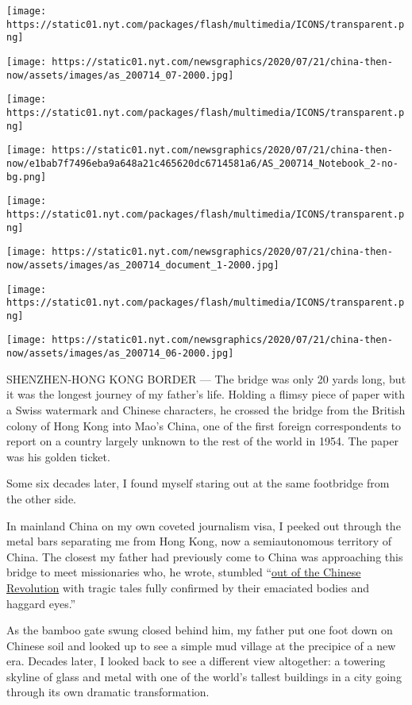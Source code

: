 \texttt{[image: https://static01.nyt.com/packages/flash/multimedia/ICONS/transparent.png]}

\texttt{[image: https://static01.nyt.com/newsgraphics/2020/07/21/china-then-now/assets/images/as\_200714\_07-2000.jpg]}

\texttt{[image: https://static01.nyt.com/packages/flash/multimedia/ICONS/transparent.png]}

\texttt{[image: https://static01.nyt.com/newsgraphics/2020/07/21/china-then-now/e1bab7f7496eba9a648a21c465620dc6714581a6/AS\_200714\_Notebook\_2-no-bg.png]}

\texttt{[image: https://static01.nyt.com/packages/flash/multimedia/ICONS/transparent.png]}

\texttt{[image: https://static01.nyt.com/newsgraphics/2020/07/21/china-then-now/assets/images/as\_200714\_document\_1-2000.jpg]}

\texttt{[image: https://static01.nyt.com/packages/flash/multimedia/ICONS/transparent.png]}

\texttt{[image: https://static01.nyt.com/newsgraphics/2020/07/21/china-then-now/assets/images/as\_200714\_06-2000.jpg]}

SHENZHEN-HONG KONG BORDER --- The bridge was only 20 yards long, but it
was the longest journey of my father's life. Holding a flimsy piece of
paper with a Swiss watermark and Chinese characters, he crossed the
bridge from the British colony of Hong Kong into Mao's China, one of the
first foreign correspondents to report on a country largely unknown to
the rest of the world in 1954. The paper was his golden ticket.

Some six decades later, I found myself staring out at the same
footbridge from the other side.

In mainland China on my own coveted journalism visa, I peeked out
through the metal bars separating me from Hong Kong, now a
semiautonomous territory of China. The closest my father had previously
come to China was approaching this bridge to meet missionaries who, he
wrote, stumbled
``\href{https://archive.nytimes.com/www.nytimes.com/library/world/asia/china-index-timeline.html}{out
of the Chinese Revolution} with tragic tales fully confirmed by their
emaciated bodies and haggard eyes.''

As the bamboo gate swung closed behind him, my father put one foot down
on Chinese soil and looked up to see a simple mud village at the
precipice of a new era. Decades later, I looked back to see a different
view altogether: a towering skyline of glass and metal with one of the
world's tallest buildings in a city going through its own dramatic
transformation.

